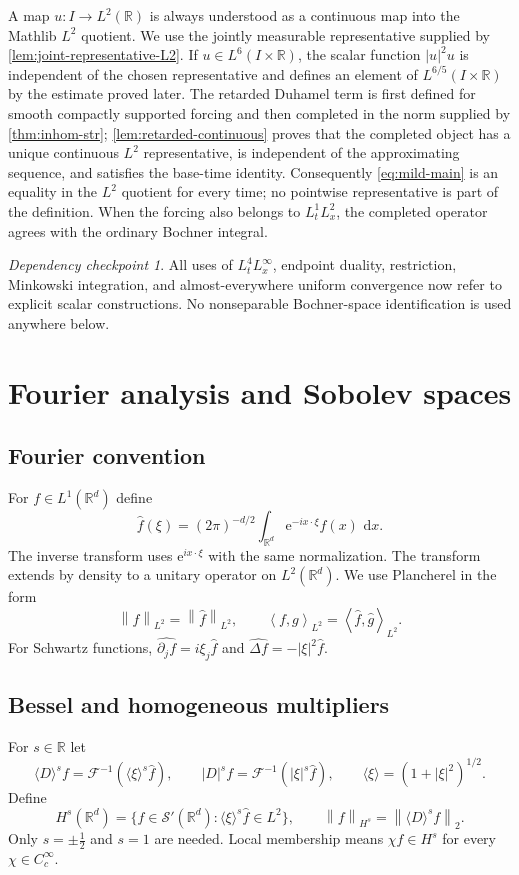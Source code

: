 \documentclass[11pt,oneside]{book}
\theoremstyle{definition}
\theoremstyle{remark}
\newtheorem{checkpoint}[theorem]{Dependency checkpoint}
\newcommand{\R}{\mathbb R}
\newcommand{\Ssch}{\mathcal S}
\newcommand{\1}{\mathbf 1}
\newcommand{\dd}{\,\mathrm d}
\newcommand{\norm}[1]{\left\lVert #1\right\rVert}
\newcommand{\pair}[2]{\left\langle #1,#2\right\rangle}
\newcommand{\FT}{\mathcal F}
\newcommand{\e}{\mathrm e}
\begin{document}
A map $u:I\to L^2(\R)$ is always understood as a continuous map into the
Mathlib $L^2$ quotient.  We use the jointly measurable representative
supplied by \cref{lem:joint-representative-L2}.  If
$u\in L^6(I\times\R)$, the scalar function $|u|^2u$ is independent of the
chosen representative and defines an element of $L^{6/5}(I\times\R)$ by the
estimate proved later.  The retarded Duhamel term is first defined for smooth compactly supported
forcing and then completed in the norm supplied by
\cref{thm:inhom-str}; \cref{lem:retarded-continuous} proves that the completed
object has a unique continuous $L^2$ representative, is independent of the
approximating sequence, and satisfies the base-time identity.  Consequently
\eqref{eq:mild-main} is an equality in the $L^2$ quotient for every time; no
pointwise representative is part of the definition.  When the forcing also
belongs to $L^1_tL^2_x$, the completed operator agrees with the ordinary
Bochner integral.

\begin{checkpoint}
All uses of $L^4_tL^\infty_x$, endpoint duality, restriction, Minkowski
integration, and almost-everywhere uniform convergence now refer to explicit
scalar constructions.  No nonseparable Bochner-space identification is used
anywhere below.
\end{checkpoint}

\chapter{Fourier analysis and Sobolev spaces}\label{chap:fourier}

\section{Fourier convention}
For $f\in L^1(\R^d)$ define
\begin{equation}
 \widehat f(\xi)=(2\pi)^{-d/2}\int_{\R^d}\e^{-ix\cdot\xi}f(x)\,\dd x.
 \label{eq:FT-convention}
\end{equation}
The inverse transform uses $\e^{ix\cdot\xi}$ with the same normalization.
The transform extends by density to a unitary operator on $L^2(\R^d)$.
We use Plancherel in the form
\[
  \norm{f}_{L^2}=\norm{\widehat f}_{L^2},
  \qquad
  \pair{f}{g}_{L^2}=\pair{\widehat f}{\widehat g}_{L^2}.
\]
For Schwartz functions,
$\widehat{\partial_jf}=i\xi_j\widehat f$ and
$\widehat{\Delta f}=-|\xi|^2\widehat f$.

\section{Bessel and homogeneous multipliers}
For $s\in\R$ let
\[
  \langle D\rangle^sf
  =\FT^{-1}(\langle\xi\rangle^s\widehat f),
  \qquad
  |D|^sf=\FT^{-1}(|\xi|^s\widehat f),
  \qquad \langle\xi\rangle=(1+|\xi|^2)^{1/2}.
\]
Define
\[
  H^s(\R^d)=\{f\in\Ssch'(\R^d):\langle\xi\rangle^s\widehat f\in L^2\},
  \qquad
  \norm{f}_{H^s}=\norm{\langle D\rangle^sf}_2.
\]
Only $s=\pm\tfrac12$ and $s=1$ are needed.  Local membership means
$\chi f\in H^s$ for every $\chi\in C_c^\infty$.
\end{document}
